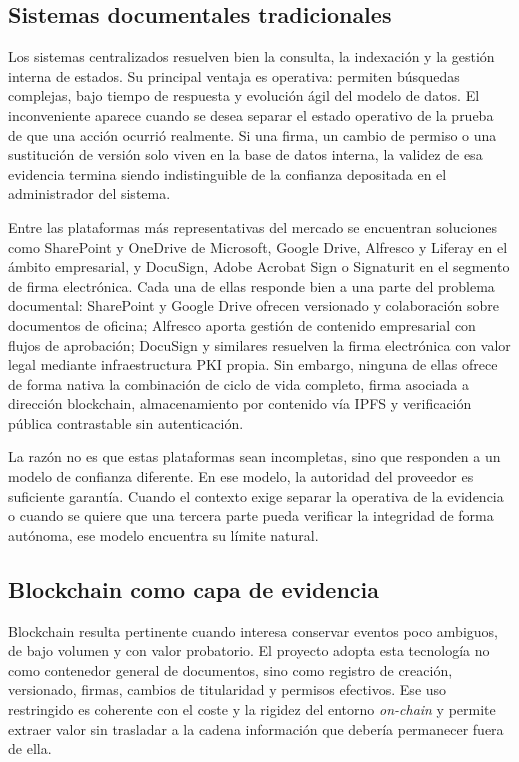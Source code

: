 \documentclass[11pt, a4paper]{article}
\begin{document}
\subsection{Sistemas documentales tradicionales}

Los sistemas centralizados resuelven bien la consulta, la indexación y la gestión interna de estados. Su principal ventaja es operativa: permiten búsquedas complejas, bajo tiempo de respuesta y evolución ágil del modelo de datos. El inconveniente aparece cuando se desea separar el estado operativo de la prueba de que una acción ocurrió realmente. Si una firma, un cambio de permiso o una sustitución de versión solo viven en la base de datos interna, la validez de esa evidencia termina siendo indistinguible de la confianza depositada en el administrador del sistema.

Entre las plataformas más representativas del mercado se encuentran soluciones como SharePoint y OneDrive de Microsoft, Google Drive, Alfresco y Liferay en el ámbito empresarial, y DocuSign, Adobe Acrobat Sign o Signaturit en el segmento de firma electrónica. Cada una de ellas responde bien a una parte del problema documental: SharePoint y Google Drive ofrecen versionado y colaboración sobre documentos de oficina; Alfresco aporta gestión de contenido empresarial con flujos de aprobación; DocuSign y similares resuelven la firma electrónica con valor legal mediante infraestructura PKI propia. Sin embargo, ninguna de ellas ofrece de forma nativa la combinación de ciclo de vida completo, firma asociada a dirección blockchain, almacenamiento por contenido vía IPFS y verificación pública contrastable sin autenticación.

La razón no es que estas plataformas sean incompletas, sino que responden a un modelo de confianza diferente. En ese modelo, la autoridad del proveedor es suficiente garantía. Cuando el contexto exige separar la operativa de la evidencia o cuando se quiere que una tercera parte pueda verificar la integridad de forma autónoma, ese modelo encuentra su límite natural.

\subsection{Blockchain como capa de evidencia}

Blockchain resulta pertinente cuando interesa conservar eventos poco ambiguos, de bajo volumen y con valor probatorio. El proyecto adopta esta tecnología no como contenedor general de documentos, sino como registro de creación, versionado, firmas, cambios de titularidad y permisos efectivos. Ese uso restringido es coherente con el coste y la rigidez del entorno \textit{on-chain} y permite extraer valor sin trasladar a la cadena información que debería permanecer fuera de ella.
\end{document}
